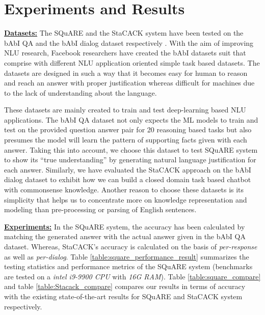 \documentclass[letterpaper]{article}
\begin{document}
\section{Experiments and Results}

\noindent\textbf{\underline{Datasets:}}
The SQuARE and the StaCACK system have been tested on the bAbI QA \cite{babi} and the bAbI dialog dataset respectively \cite{babi_dialog}. With the aim of improving NLU research, Facebook researchers have created the bAbI datasets suit that comprise with different NLU application oriented simple task based datasets. The datasets are designed in such a way that it becomes easy for human to reason and reach an answer with proper justification whereas difficult for machines due to the lack of understanding about the language. 

These datasets are mainly created to train and test deep-learning based NLU applications. The bAbI QA dataset not only expects the ML models to train and test on the provided question answer pair for 20 reasoning based tasks but also presumes the model will learn the pattern of supporting facts given with each answer. Taking this into account, we choose this dataset to test SQuARE system to show its ``true understanding'' by generating natural language justification for each answer. Similarly, we have evaluated the StaCACK approach on the bAbI dialog dataset to exhibit how we can build a closed domain task based chatbot with commonsense knowledge. Another reason to choose these datasets is its simplicity that helps us to concentrate more on knowledge representation and modeling than pre-processing or parsing of English sentences.

\smallskip 
\noindent\textbf{\underline{Experiments:}}
In the SQuARE system, the accuracy has been calculated by matching the generated answer with the actual answer given in the bAbI QA dataset. Whereas, StaCACK's accuracy is calculated on the basis of \textit{per-response} as well as \textit{per-dialog}. Table \ref{table:square_performance_result} summarizes the testing statistics and performance metrics of the SQuARE system (benchmarks are tested on a \textit{intel i9-9900 CPU} with \textit{16G RAM}).
Table \ref{table:square_compare} and table \ref{table:Stacack_compare} compares our results in terms of accuracy with the existing state-of-the-art results for SQuARE and StaCACK system respectively. 
\end{document}
